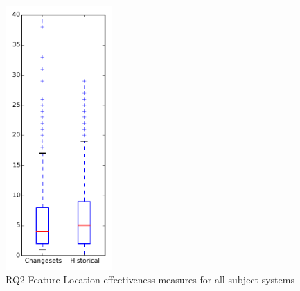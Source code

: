 
\begin{figure}[t]
\centering
\includegraphics[width=0.36\textwidth]{figures/flt/rq2_overview}
\caption{RQ2 Feature Location effectiveness measures for all subject systems}
\label{fig:flt:rq2:overview}
\end{figure}
